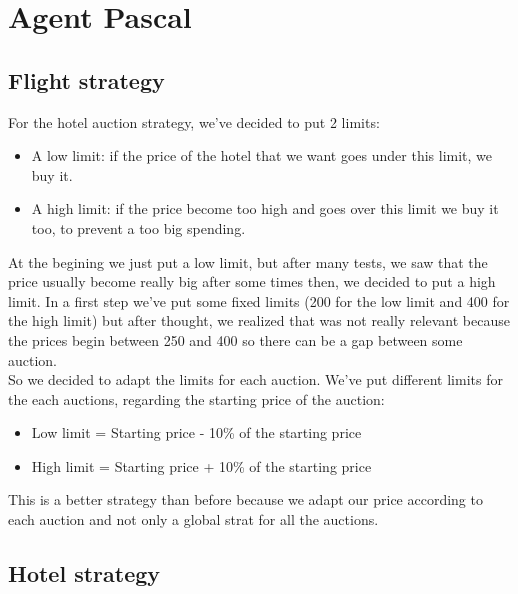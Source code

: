 \section{Agent Pascal}

\subsection{Flight strategy}

For the hotel auction strategy, we've decided to put 2 limits:\\
\begin{itemize}
\item A low limit: if the price of the hotel that we want goes under this limit, we buy it.
\item A high limit: if the price become too high and goes over this limit we buy it too, to prevent a too big spending.
\end{itemize}
At the begining we just put a low limit, but after many tests, we saw that the price usually become really big after some times then, we decided to put a high limit.
In a first step we've put some fixed limits (200 for the low limit and 400 for the high limit) but after thought, we realized that was not really relevant because the prices begin between 250 and 400 so there can be a gap between some auction.\\
So we decided to adapt the limits for each auction. We've put different limits for the each auctions, regarding the starting price of the auction:\\
\begin{itemize}
\item Low limit = Starting price - 10\% of the starting price
\item High limit = Starting price + 10\% of the starting price
\end{itemize}
This is a better strategy than before because we adapt our price according to each auction and not only a global strat for all the auctions.

\subsection{Hotel strategy}

